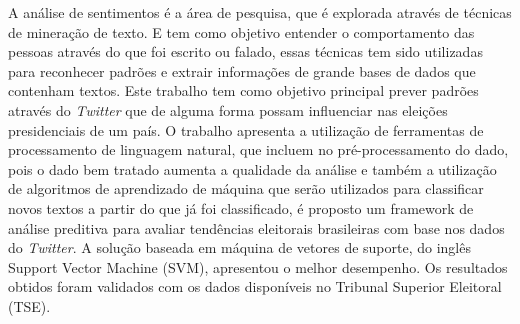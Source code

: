 A análise de sentimentos é a área de pesquisa, que é explorada através de técnicas de 
mineração de texto. E tem como objetivo entender o comportamento das pessoas através
do que foi escrito ou falado, essas técnicas tem sido utilizadas para reconhecer 
padrões e extrair informações de grande bases de dados que contenham textos.
Este trabalho tem como objetivo principal prever padrões através do \textit{Twitter}
que de alguma forma possam influenciar nas eleições presidenciais de um país.
O trabalho apresenta a utilização de ferramentas de processamento de linguagem natural, que 
incluem no pré-processamento do dado, pois o dado bem tratado aumenta a qualidade da análise
e também a utilização de algoritmos de aprendizado de máquina que serão utilizados para classificar
novos textos a partir do que já foi classificado, é proposto um framework de análise preditiva para
avaliar tendências eleitorais brasileiras com base nos dados do \textit{Twitter}.
A solução baseada em máquina de vetores de suporte, do inglês Support Vector Machine
(SVM), apresentou o melhor desempenho. Os resultados obtidos
foram validados com os dados disponíveis no Tribunal Superior
Eleitoral (TSE).